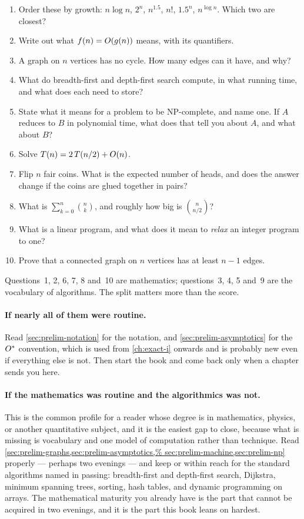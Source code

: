 \begin{enumerate}[leftmargin=*]
  \item Order these by growth: $n\log n$, $2^n$, $n^{1.5}$, $n!$, $1.5^n$,
        $n^{\log n}$. Which two are closest?
  \item Write out what $f(n) = O\!\left(g(n)\right)$ means, with its quantifiers.
  \item A graph on $n$ vertices has no cycle. How many edges can it have, and
        why?
  \item What do breadth-first and depth-first search compute, in what running
        time, and what does each need to store?
  \item State what it means for a problem to be \textrm{NP}-complete, and name
        one. If $A$ reduces to $B$ in polynomial time, what does that tell you
        about $A$, and what about $B$?
  \item Solve $T(n) = 2\,T(n/2) + O\!\left(n\right)$.
  \item Flip $n$ fair coins. What is the expected number of heads, and does the
        answer change if the coins are glued together in pairs?
  \item What is $\sum_{k=0}^{n}\binom{n}{k}$, and roughly how big is
        $\binom{n}{n/2}$?
  \item What is a linear program, and what does it mean to \emph{relax} an
        integer program to one?
  \item Prove that a connected graph on $n$ vertices has at least $n-1$ edges.
\end{enumerate}

Questions~1, 2, 6, 7, 8 and~10 are mathematics; questions~3, 4, 5 and~9 are the
vocabulary of algorithms. The split matters more than the score.

\paragraph{If nearly all of them were routine.}
Read \cref{sec:prelim-notation} for the notation, and
\cref{sec:prelim-asymptotics} for the $O^{*}$ convention, which is used from
\cref{ch:exact-i} onwards and is probably new even if everything else is not.
Then start the book and come back only when a chapter sends you here.

\paragraph{If the mathematics was routine and the algorithmics was not.}
This is the common profile for a reader whose degree is in mathematics,
physics, or another quantitative subject, and it is the easiest gap to close,
because what is missing is vocabulary and one model of computation rather than
technique. Read \cref{sec:prelim-graphs,sec:prelim-asymptotics,%
sec:prelim-machine,sec:prelim-np} properly --- perhaps two evenings --- and
keep \citet{CLRS2022} or \citet{KleinbergTardos2005} within reach for the
standard algorithms named in passing: breadth-first and depth-first search,
Dijkstra, minimum spanning trees, sorting, hash tables, and dynamic programming
on arrays. The mathematical maturity you already have is the part that cannot
be acquired in two evenings, and it is the part this book leans on hardest.

